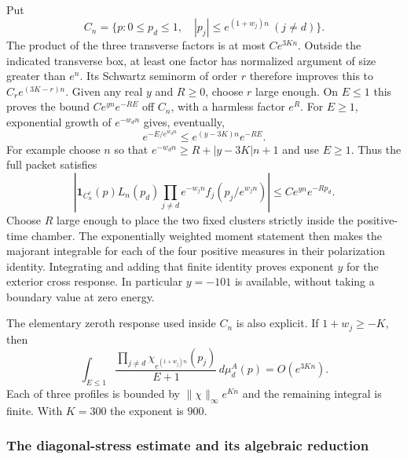 Put
\[
 C_n=\{p:0\leq p_d\leq1,\quad
                 |p_j|\leq e^{(1+w_j)n}\ (j\ne d)\}.
\]
The product of the three transverse factors is at most $Ce^{3Kn}$.
Outside the indicated transverse box, at least one factor has normalized
argument of size greater than $e^n$. Its Schwartz seminorm of order $r$
therefore improves this to $C_r e^{(3K-r)n}$. Given any real $y$ and
$R\geq0$, choose $r$ large enough. On $E\leq1$ this proves the bound
$C e^{yn}e^{-RE}$ off $C_n$, with a harmless factor $e^R$.
For $E\geq1$, exponential growth of $e^{-w_dn}$ gives, eventually,
\[
 e^{-E/e^{w_dn}}\leq e^{(y-3K)n}e^{-RE}.
\]
For example choose $n$ so that
$e^{-w_dn}\geq R+|y-3K|n+1$ and use $E\geq1$.
Thus the full packet satisfies
\begin{equation}\label{eq:packet-exterior-price}
 |\mathbf1_{C_n^c}(p)L_n(p_d)
       \prod_{j\ne d}e^{-w_jn}f_j(p_j/e^{w_jn})|
 \leq C e^{yn}e^{-Rp_d}.
\end{equation}
Choose $R$ large enough to place the two fixed clusters strictly inside
the positive-time chamber. The exponentially weighted moment statement
then makes the majorant integrable for each of the four positive measures
in their polarization identity. Integrating and adding that finite identity
proves exponent $y$ for the exterior cross response. In particular $y=-101$
is available, without taking a boundary value at zero energy.

The elementary zeroth response used inside $C_n$ is also explicit. If
$1+w_j\geq-K$, then
\[
 \int_{E\leq1}\frac{\prod_{j\ne d}\chi_{e^{(1+w_j)n}}(p_j)}{E+1}
                  \,d\mu_d^A(p)=O(e^{3Kn}).
\]
Each of three profiles is bounded by $\|\chi\|_\infty e^{Kn}$ and the
remaining integral is finite. With $K=300$ the exponent is $900$.

\subsubsection{The diagonal-stress estimate and its algebraic reduction}

